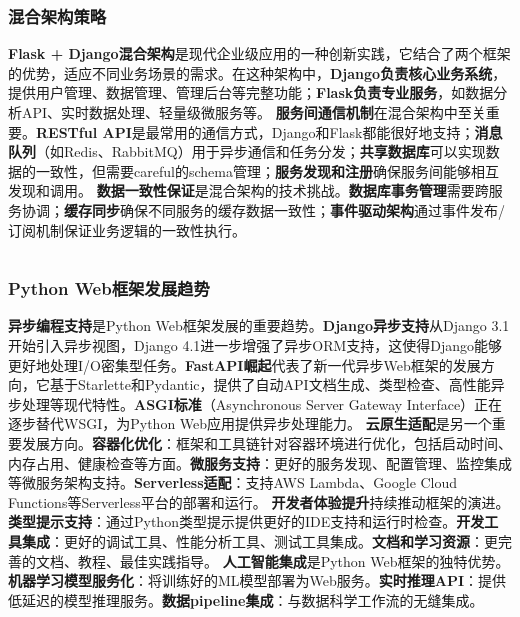 {{{{{{{{{{{{{{\subsubsection{混合架构策略}\label{ux6df7ux5408ux67b6ux6784ux7b56ux7565} \textbf{Flask +
Django混合架构}是现代企业级应用的一种创新实践，它结合了两个框架的优势，适应不同业务场景的需求。在这种架构中，\textbf{Django负责核心业务系统}，提供用户管理、数据管理、管理后台等完整功能；\textbf{Flask负责专业服务}，如数据分析API、实时数据处理、轻量级微服务等。
\textbf{服务间通信机制}在混合架构中至关重要。\textbf{RESTful
API}是最常用的通信方式，Django和Flask都能很好地支持；\textbf{消息队列}（如Redis、RabbitMQ）用于异步通信和任务分发；\textbf{共享数据库}可以实现数据的一致性，但需要careful的schema管理；\textbf{服务发现和注册}确保服务间能够相互发现和调用。
\textbf{数据一致性保证}是混合架构的技术挑战。\textbf{数据库事务管理}需要跨服务协调；\textbf{缓存同步}确保不同服务的缓存数据一致性；\textbf{事件驱动架构}通过事件发布/订阅机制保证业务逻辑的一致性执行。
\begin{lstlisting}[language=Python] \end{lstlisting} \subsubsection{Python
Web框架发展趋势}\label{python-webux6846ux67b6ux53d1ux5c55ux8d8bux52bf} \textbf{异步编程支持}是Python
Web框架发展的重要趋势。\textbf{Django异步支持}从Django 3.1开始引入异步视图，Django
4.1进一步增强了异步ORM支持，这使得Django能够更好地处理I/O密集型任务。\textbf{FastAPI崛起}代表了新一代异步Web框架的发展方向，它基于Starlette和Pydantic，提供了自动API文档生成、类型检查、高性能异步处理等现代特性。\textbf{ASGI标准}（Asynchronous
Server Gateway Interface）正在逐步替代WSGI，为Python Web应用提供异步处理能力。
\textbf{云原生适配}是另一个重要发展方向。\textbf{容器化优化}：框架和工具链针对容器环境进行优化，包括启动时间、内存占用、健康检查等方面。\textbf{微服务支持}：更好的服务发现、配置管理、监控集成等微服务架构支持。\textbf{Serverless适配}：支持AWS
Lambda、Google Cloud Functions等Serverless平台的部署和运行。
\textbf{开发者体验提升}持续推动框架的演进。\textbf{类型提示支持}：通过Python类型提示提供更好的IDE支持和运行时检查。\textbf{开发工具集成}：更好的调试工具、性能分析工具、测试工具集成。\textbf{文档和学习资源}：更完善的文档、教程、最佳实践指导。
\textbf{人工智能集成}是Python
Web框架的独特优势。\textbf{机器学习模型服务化}：将训练好的ML模型部署为Web服务。\textbf{实时推理API}：提供低延迟的模型推理服务。\textbf{数据pipeline集成}：与数据科学工作流的无缝集成。
}}}}}}}}}}}}}}
